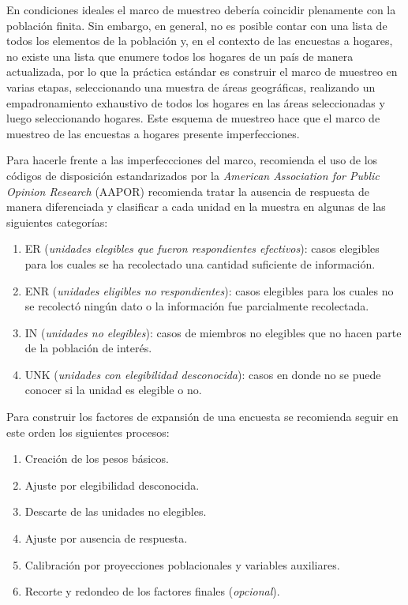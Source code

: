 \documentclass[
  12pt,
]{book}
\providecommand{\tightlist}{%
  \setlength{\itemsep}{0pt}\setlength{\parskip}{0pt}}
\begin{document}
En condiciones ideales el marco de muestreo debería coincidir plenamente con la población finita. Sin embargo, en general, no es posible contar con una lista de todos los elementos de la población y, en el contexto de las encuestas a hogares, no existe una lista que enumere todos los hogares de un país de manera actualizada, por lo que la práctica estándar es construir el marco de muestreo en varias etapas, seleccionando una muestra de áreas geográficas, realizando un empadronamiento exhaustivo de todos los hogares en las áreas seleccionadas y luego seleccionando hogares. Este esquema de muestreo hace que el marco de muestreo de las encuestas a hogares presente imperfecciones.

Para hacerle frente a las imperfeccciones del marco, \citet{Valliant_Dever_2017} recomienda el uso de los códigos de disposición estandarizados por la \emph{American Association for Public Opinion Research} (AAPOR) recomienda tratar la ausencia de respuesta de manera diferenciada y clasificar a cada unidad en la muestra en algunas de las siguientes categorías:

\begin{enumerate}
\def\labelenumi{\arabic{enumi}.}
\tightlist
\item
  ER (\emph{unidades elegibles que fueron respondientes efectivos}): casos elegibles para los cuales se ha recolectado una cantidad suficiente de información.
\item
  ENR (\emph{unidades eligibles no respondientes}): casos elegibles para los cuales no se recolectó ningún dato o la información fue parcialmente recolectada.
\item
  IN (\emph{unidades no elegibles}): casos de miembros no elegibles que no hacen parte de la población de interés.
\item
  UNK (\emph{unidades con elegibilidad desconocida}): casos en donde no se puede conocer si la unidad es elegible o no.
\end{enumerate}

Para construir los factores de expansión de una encuesta se recomienda seguir en este orden los siguientes procesos:

\begin{enumerate}
\def\labelenumi{\arabic{enumi}.}
\tightlist
\item
  Creación de los pesos básicos.
\item
  Ajuste por elegibilidad desconocida.
\item
  Descarte de las unidades no elegibles.
\item
  Ajuste por ausencia de respuesta.
\item
  Calibración por proyecciones poblacionales y variables auxiliares.
\item
  Recorte y redondeo de los factores finales (\emph{opcional}).
\end{enumerate}
\end{document}
